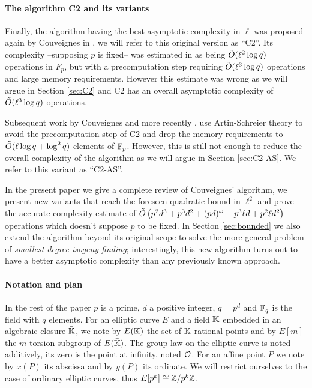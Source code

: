 \paragraph{The algorithm C2 and its variants}
Finally, the algorithm having the best asymptotic complexity in $\ell$
was proposed again by Couveignes in \cite{Cou96}, we will refer to
this original version as ``C2''. Its complexity --supposing $p$ is
fixed-- was estimated in \cite{Cou96} as being $\tilde{O}(\ell^2\log q)$
operations in $F_p$, but with a precomputation step requiring
$\tilde{O}(\ell^3\log q)$ operations and large memory
requirements. However this estimate was wrong as we will argue in
Section \ref{sec:C2} and C2 has an overall asymptotic complexity of
$\tilde{O}(\ell^3\log q)$ operations.

Subsequent work by Couveignes \cite{Cou00} and more recently
\cite{DFS09}, use Artin-Schreier theory to avoid the precomputation
step of C2 and drop the memory requirements to $\tilde{O}(\ell\log q +
\log^2 q)$ elements of $\mathbb{F}_p$. However, this is still not enough to
reduce the overall complexity of the algorithm as we will argue in
Section \ref{sec:C2-AS}. We refer to this variant as ``C2-AS''.

In the present paper we give a complete review of Couveignes'
algorithm, we present new variants that reach the foreseen quadratic
bound in $\ell^2$ and prove the accurate complexity estimate of
$\tilde{O}\left( p^2d^3 + p^3d^2 + (pd)^\omega + p^3\ell d + p^2\ell d^2
\right)$ operations which doesn't suppose $p$ to be fixed. In Section
\ref{sec:bounded} we also extend the algorithm beyond its original
scope to solve the more general problem of \emph{smallest degree
  isogeny finding}; interestingly, this new algorithm turns out to
have a better asymptotic complexity than any previously known
approach.

\paragraph{Notation and plan}
In the rest of the paper $p$ is a prime, $d$ a positive integer,
$q=p^d$ and $\mathbb{F}_q$ is the field with $q$ elements. For an elliptic
curve $E$ and a field $\mathbb{K}$ embedded in an algebraic closure
$\bar{\mathbb{K}}$, we note by $E(\mathbb{K})$ the set of $\mathbb{K}$-rational points and by
$E[m]$ the $m$-torsion subgroup of $E(\bar{\mathbb{K}})$. The group law on
the elliptic curve is noted additively, its zero is the point at
infinity, noted $\mathcal{O}$. For an affine point $P$ we note by $x(P)$ its
abscissa and by $y(P)$ its ordinate. We will restrict ourselves to the
case of ordinary elliptic curves, thus $E[p^k]\cong\mathbb{Z}/p^k\mathbb{Z}$.


